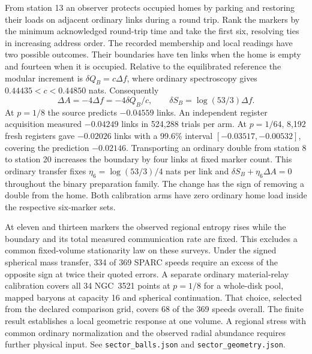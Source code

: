 \documentclass[11pt]{article}
\begin{document}
From station 13 an observer protects occupied homes by parking and
restoring their loads on adjacent ordinary links during a round trip.
Rank the markers by the minimum acknowledged round-trip time and take
the first six, resolving ties in increasing address order. The recorded
membership and local readings have two possible outcomes. Their
boundaries have ten links when the home is empty and fourteen when it
is occupied. Relative to the equilibrated reference the modular
increment is \(\delta Q_B=c\Delta f\), where ordinary spectroscopy
gives \(0.44435<c<0.44850\) nats. Consequently
\[
  \Delta A=-4\Delta f=-4\delta Q_B/c,\qquad
  \delta S_B=\log(53/3)\Delta f .
\]
At \(p=1/8\) the source predicts \(-0.04559\) links. An independent
register acquisition measured \(-0.04249\) links in 524,288 trials
per arm. At \(p=1/64\), 8,192 fresh registers gave \(-0.02026\)
links with a 99.6\% interval \([-0.03517,-0.00532]\), covering the
prediction \(-0.02146\). Transporting an ordinary double from station 8 to station 20
increases the boundary by four links at fixed marker count. This
ordinary transfer fixes \(\eta_6=\log(53/3)/4\) nats per link and
\(\delta S_B+\eta_6\Delta A=0\) throughout the binary preparation
family. The change has the sign of removing a double from the home.
Both calibration arms have zero ordinary home load inside the
respective six-marker sets.

At eleven and thirteen markers the observed regional entropy rises
while the boundary and its total measured communication rate are fixed.
This excludes a common fixed-volume stationarity law on these surveys.
Under the signed spherical mass transfer, 334 of 369 SPARC speeds
require an excess of the opposite sign at twice their quoted errors.
A separate ordinary material-relay calibration covers all 34 NGC~3521
points at \(p=1/8\) for a whole-disk pool, mapped baryons at capacity
16 and spherical continuation. That choice, selected from the declared
comparison grid, covers 68 of the 369 speeds overall. The finite
result establishes a local geometric response at one volume. A
regional stress with common ordinary normalization and the observed
radial abundance requires further physical input.
See \texttt{sector\_balls.json} and \texttt{sector\_geometry.json}.
\end{document}
